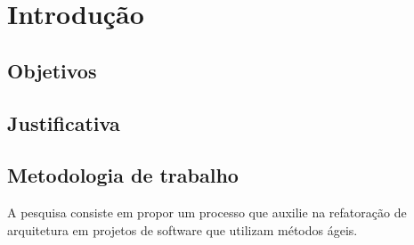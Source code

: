 \chapter{Introdução}

\section{Objetivos}

\section{Justificativa}

\section{Metodologia de trabalho}

A pesquisa consiste em propor um processo que auxilie na refatoração de arquitetura em projetos de software que utilizam métodos ágeis.

